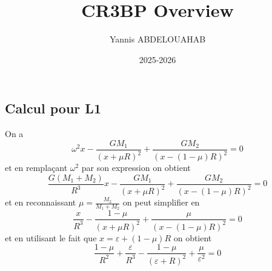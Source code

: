 \documentclass[20pt]{extarticle}
\title{CR3BP Overview}
\author{Yannis ABDELOUAHAB}
\date{2025-2026}
\theoremstyle{definition}
\theoremstyle{definition}
\begin{document}
	\subsection*{Calcul pour L1}
	On a
	\begin{equation*}
		\omega^2x - \frac{GM_1}{(x+\mu R)^2} + \frac{GM_2}{(x-(1-\mu)R)^2} = 0
	\end{equation*}
	et en remplaçant $\omega^2$ par son expression on obtient
	\begin{equation*}
		\frac{G(M_1 + M_2)}{R^3}x - \frac{GM_1}{(x+\mu R)^2} + \frac{GM_2}{(x-(1-\mu)R)^2} = 0
	\end{equation*}
	et en reconnaissant $\mu = \frac{M_2}{M_1+M_2}$ on peut simplifier en
	\begin{equation*}
		\frac{x}{R^3} - \frac{1-\mu}{(x+\mu R)^2} + \frac{\mu}{(x-(1-\mu)R)^2} = 0
	\end{equation*}
	et en utilisant le fait que $x=\varepsilon + (1-\mu)R$ on obtient
	\begin{equation*}
		\frac{1-\mu}{R^2} + \frac{\varepsilon}{R^3} - \frac{1-\mu}{(\varepsilon+R)^2} + \frac{\mu}{\varepsilon^2} = 0
	\end{equation*}
	
\end{document}
